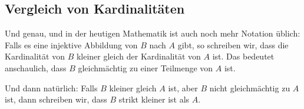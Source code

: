 \subsection{Vergleich von Kardinalitäten}

\begin{spoken-clean}[00:18:44 - 00:23:33]
Und genau, und in der heutigen Mathematik ist auch noch mehr Notation üblich: Falls es eine injektive Abbildung von $B$ nach $A$ gibt, so schreiben wir, dass die Kardinalität von $B$ kleiner gleich der Kardinalität von $A$ ist. Das bedeutet anschaulich, dass $B$ gleichmächtig zu einer Teilmenge von $A$ ist.

Und dann natürlich: Falls $B$ kleiner gleich $A$ ist, aber $B$ nicht gleichmächtig zu $A$ ist, dann schreiben wir, dass $B$ strikt kleiner ist als $A$.
\end{spoken-clean}

\begin{math-stroke}
\end{math-stroke}

